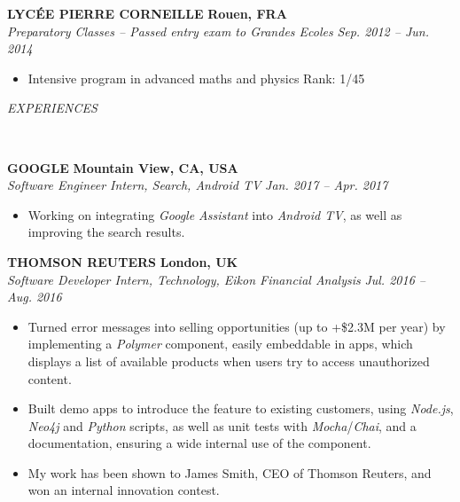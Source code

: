 \documentclass[a4paper, 12pt]{article}
\newcommand{\marginline}{-0.3cm}
\newcommand{\margincontent}{-0.6cm}
\newcommand{\marginbeforesection}{0.3cm}
\newcommand{\linewidthperso}{0.02cm}
\newcommand{\stylesection}[1]{
  \vspace{\marginbeforesection}
  \begin{normalsize}\textit{#1}\end{normalsize}
  \vspace{\marginline}\\
  \noindent\makebox[\linewidth]{\rule{\textwidth}{\linewidthperso}}

}
\newcommand{\styletitle}[1]{\textbf{#1}}
\newcommand{\styledesc}[1]{\textit{#1}}
\newcommand{\styleloc}[1]{\textbf{#1}}
\newcommand{\styledates}[1]{\textit{#1}}
\begin{document}
\begin{footnotesize}
\styletitle{LYC\'EE PIERRE CORNEILLE} \hfill \styleloc{Rouen, FRA}\\
\styledesc{Preparatory Classes -- Passed entry exam to Grandes Ecoles} \hfill \styledates{Sep. 2012 -- Jun. 2014}\\
\vspace{\margincontent}
\begin{itemize}
  \item Intensive program in advanced maths and physics \hfill Rank: 1/45
\end{itemize}

\stylesection{EXPERIENCES}

\styletitle{GOOGLE} \hfill \styleloc{Mountain View, CA, USA}\\ 
\styledesc{Software Engineer Intern, Search, Android TV} \hfill \styledates{Jan. 2017 -- Apr. 2017}\\
\vspace{\margincontent}
\begin{itemize}
  \item Working on integrating \textit{Google Assistant} into \textit{Android TV}, as well as improving the search results.
\end{itemize}

\styletitle{THOMSON REUTERS} \hfill \styleloc{London, UK}\\ 
\styledesc{Software Developer Intern, Technology, Eikon Financial Analysis} \hfill \styledates{Jul. 2016 -- Aug. 2016}\\
\vspace{\margincontent}
\begin{itemize}
  \item Turned error messages into selling opportunities (up to +\$2.3M per year) by implementing a \textit{Polymer} component, easily embeddable in apps, which displays a list of available products when users try to access unauthorized content.
  \item Built demo apps to introduce the feature to existing customers, using \textit{Node.js}, \textit{Neo4j} and \textit{Python} scripts, as well as unit tests with \textit{Mocha}/\textit{Chai}, and a documentation, ensuring a wide internal use of the component.
  \item My work has been shown to James Smith, CEO of Thomson Reuters, and won an internal innovation contest.
\end{itemize}


\end{footnotesize}
\end{document}
